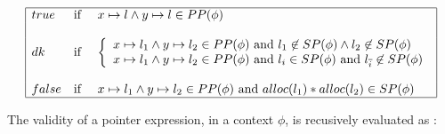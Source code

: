 $$
\begin{array}{|lll|}
\hline 
\true & \mbox{if } & \Pointsto{x}{l}\wedge\Pointsto{y}{l} \in \Pp{\phi}\\
&&\\
\dk & \mbox{if} & \left \lbrace 
\begin{array}{l} 
 \Pointsto{x}{l_1}\wedge\Pointsto{y}{l_2} \in \Pp{\phi} \ \mbox{and} \ l_1 \not\in \Sp{\phi}\wedge l_2\not\in\Sp{\phi} \\
 \Pointsto{x}{l_1}\wedge\Pointsto{y}{l_2} \in \Pp{\phi} \ \mbox{and} \
	l_i \in \Sp{\phi} \ \mbox{and} \ l_{\overline{i}} \not\in \Sp{\phi}
	\end{array} \right . \\
&&\\
\false & \mbox{if}& \Pointsto{x}{l_1}\wedge\Pointsto{y}{l_2} \in \Pp{\phi} \ \mbox{and} \ \Sep{\Alloc{l_1}}{\Alloc{l_2}} \in \Sp{\phi} \\ 
\hline
\end{array} 
$$ 

 The validity of a pointer expression, in a context $\phi$, is recusively evaluated as : 

